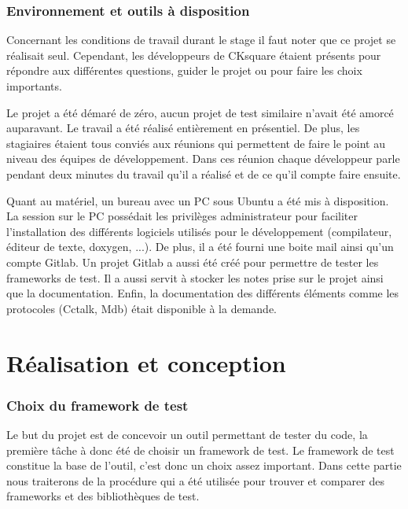 \documentclass[a4paper]{article}
\begin{document}
\section{Environnement et outils à disposition}%

Concernant les conditions de travail durant le stage il faut noter que ce projet
se réalisait seul. Cependant, les développeurs de CKsquare étaient présents pour
répondre aux différentes questions, guider le projet ou pour faire les choix
importants.

Le projet a été démaré de zéro, aucun projet de test similaire n'avait été
amorcé auparavant. Le travail a été réalisé entièrement en présentiel. De plus,
les stagiaires étaient tous conviés aux réunions qui permettent de faire le
point au niveau des équipes de développement. Dans ces réunion chaque
développeur parle pendant deux minutes du travail qu'il a réalisé et de ce qu'il
compte faire ensuite.

Quant au matériel, un bureau avec un PC sous Ubuntu a été mis à disposition. La
session sur le PC possédait les privilèges administrateur pour faciliter
l'installation des différents logiciels utilisés pour le développement
(compilateur, éditeur de texte, doxygen, ...). De plus, il a été fourni une
boite mail ainsi qu'un compte Gitlab. Un projet Gitlab a aussi été créé pour
permettre de tester les frameworks de test. Il a aussi servit à stocker les
notes prise sur le projet ainsi que la documentation. Enfin, la documentation
des différents éléments comme les protocoles (Cctalk, Mdb) était disponible à la
demande.
\clearpage
\part{Réalisation et conception}

\section{Choix du framework de test}%

Le but du projet est de concevoir un outil permettant de tester du code, la
première tâche à donc été de choisir un framework de test. Le framework de test
constitue la base de l'outil, c'est donc un choix assez important. Dans cette
partie nous traiterons de la procédure qui a été utilisée pour trouver et
comparer des frameworks et des bibliothèques de test.
\end{document}
